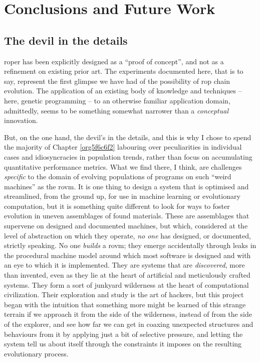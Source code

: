 \documentclass[12pt,glossary]{dalthesis}
\begin{document}
\chapter{Conclusions and Future Work}
\label{sec:orge6c0fb5}
\label{org9094ec2}

\section{The devil in the details}
\label{sec:orgfda312a}

\Gls{roper} has been explicitly designed as a ``proof of concept'', and not
as a refinement on existing prior art. The experiments documented here,
that is to say, represent the first glimpse we have had of the possibility
of \gls{rop} chain evolution. The application of an existing body of knowledge
and techniques -- here, genetic programming -- to an otherwise familiar
application domain, admittedly, seems to be something somewhat narrower than
a \emph{conceptual} innovation. 

But, on the one hand, the devil's in the details, and this is why I chose to
spend the majority of Chapter \ref{org5f6c6f2} labouring over peculiarities
in individual cases and idiosyncracies in population trends, rather than focus
on accumulating quantitative performance metrics. What we find there, I think,
are challenges \emph{specific} to the domain of evolving populations of programs on
such ``weird machines'' as the \gls{rovm}. It is one thing to design a system that
is optimised and streamlined, from the ground up, for use in machine learning
or evolutionary computation, but it is something quite different to look for
ways to foster evolution in uneven assemblages of found materials. These are
assemblages that supervene on designed and documented machines, but which,
considered at the level of abstraction on which they operate, \emph{no one} has
designed, or documented, strictly speaking. No one \emph{builds} a \gls{rovm}; they
emerge accidentally through leaks in the procedural machine model around which
most software is designed and with an eye to which it is implemented. They
are systems that are \emph{discovered}, more than invented, even as they lie at
the heart of artificial and meticulously crafted systems. They form a sort
of junkyard wilderness at the heart of computational civilization. Their
exploration and study is the art of hackers, but this project began with the
intuition that something more might be learned of this strange terrain if
we approach it from the side of the wilderness, instead of from the side of
the explorer, and see how far we can get in coaxing unexpected structures 
and behaviours from it by applying just a bit of selective pressure, and
letting the system tell us about itself through the constraints it imposes 
on the resulting evolutionary process. 
\end{document}

